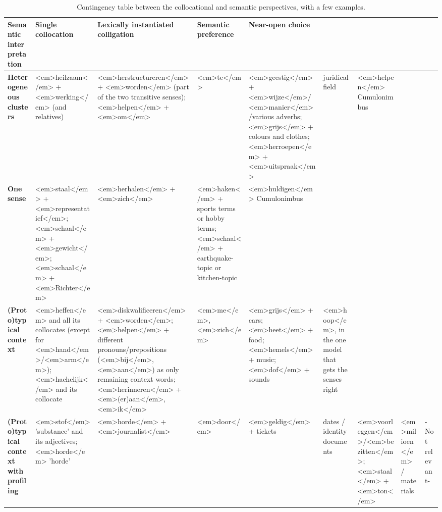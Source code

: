 \documentclass[
]{book}
\begin{document}
\begin{table}

\caption{\label{tab:colsem}Contingency table between the collocational and semantic perspectives, with a few examples.}
\centering
\begin{tabu} to 
\toprule
Semantic interpretation & Single collocation & Lexically instantiated colligation & Semantic preference & Near-open choice\\
\midrule
\textbf{Heterogeneous clusters} & <em>heilzaam</em> + <em>werking</em> (and relatives) & <em>herstructureren</em> + <em>worden</em> (part of the two transitive senses); <em>helpen</em> + <em>om</em> & <em>te</em> & <em>geestig</em> + <em>wijze</em>/<em>manier</em>/various adverbs; <em>grijs</em> + colours and clothes; <em>herroepen</em> + <em>uitspraak</em> & juridical field & <em>helpen</em> Cumulonimbus\\
\addlinespace
\textbf{One sense} & <em>staal</em> + <em>representatief</em>; <em>schaal</em> + <em>gewicht</em>; <em>schaal</em> + <em>Richter</em> & <em>herhalen</em> + <em>zich</em> & <em>haken</em> + sports terms or hobby terms; <em>schaal</em> + earthquake-topic or kitchen-topic & <em>huldigen</em> Cumulonimbus\\
\addlinespace
\textbf{(Proto)typical context} & <em>heffen</em> and all its collocates (except for <em>hand</em>/<em>arm</em>); <em>hachelijk</em> and its collocate & <em>diskwalificeren</em> + <em>worden</em>; <em>helpen</em> + different pronouns/prepositions (<em>bij</em>, <em>aan</em>) as only remaining context words; <em>herinneren</em> + <em>(er)aan</em>, <em>ik</em> & <em>me</em>, <em>zich</em> & <em>grijs</em> + cars; <em>heet</em> + food; <em>hemels</em> + music; <em>dof</em> + sounds & <em>hoop</em>, in the one model that gets the senses right\\
\addlinespace
\textbf{(Proto)typical context with profiling} & <em>stof</em> 'substance' and its adjectives; <em>horde</em> 'horde' & <em>horde</em> + <em>journalist</em> & <em>door</em> & <em>geldig</em> + tickets & dates / identity documents & <em>voorleggen</em>/<em>bezitten</em>; <em>staal</em> + <em>ton</em> & <em>milioen</em> / materials & -Not relevant-\\
\bottomrule
\end{tabu}
\end{table}
\end{document}
